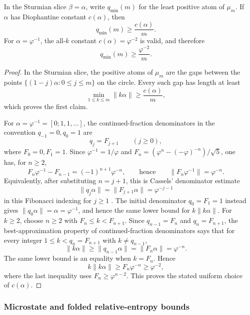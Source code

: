 \begin{proposition}\label{prop:qmin-lowerbound-markov}
In the Sturmian slice \(\beta=\alpha\), write \(q_{\min}(m)\) for the least
positive atom of \(\mu_m\). If \(\alpha\) has Diophantine constant
\(c(\alpha)\), then
\[
q_{\min}(m)\ge \frac{c(\alpha)}{m}.
\]
For \(\alpha=\varphi^{-1}\), the all-\(k\) constant \(c(\alpha)=\varphi^{-2}\)
is valid, and therefore
\[
q_{\min}(m)\ge \frac{\varphi^{-2}}{m}.
\]
\end{proposition}

\begin{proof}
In the Sturmian slice, the positive atoms of \(\mu_m\) are the gaps between the
points \(\{(1-j)\alpha:0\le j\le m\}\) on the circle. Every such gap has length
at least
\[
\min_{1\le k\le m}\|k\alpha\|
\ge \frac{c(\alpha)}{m},
\]
which proves the first claim.

For \(\alpha=\varphi^{-1}=[0;1,1,\ldots]\), the continued-fraction
denominators in the convention \(q_{-1}=0,q_0=1\) are
\[
q_j=F_{j+1}\qquad(j\ge0),
\]
where \(F_0=0,F_1=1\).  Since
\(\varphi^{-1}=1/\varphi\) and \(F_n=(\varphi^n-(-\varphi)^{-n})/\sqrt5\),
one has, for \(n\ge2\),
\[
F_n\varphi^{-1}-F_{n-1}=(-1)^{n+1}\varphi^{-n},
\qquad\text{hence}\qquad
\|F_n\varphi^{-1}\|=\varphi^{-n}.
\]
Equivalently, after substituting \(n=j+1\), this is Cassels' denominator
estimate
\[
\|q_j\alpha\|=\|F_{j+1}\alpha\|=\varphi^{-j-1}
\]
in this Fibonacci indexing for \(j\ge1\) \cite[Ch.~I]{Cassels1957}.  The
initial denominator \(q_0=F_1=1\) instead gives
\(\|q_0\alpha\|=\alpha=\varphi^{-1}\), and hence the same lower bound for
\(k\|k\alpha\|\).  For \(k\ge2\), choose \(n\ge2\) with
\(F_n\le k<F_{n+1}\).  Since \(q_{n-1}=F_n\) and \(q_n=F_{n+1}\), the
best-approximation property of continued-fraction denominators says that for
every integer \(1\le k<q_n=F_{n+1}\) with \(k\ne q_{n-1}\),
\[
\|k\alpha\|\ge \|q_{n-1}\alpha\|=\|F_n\alpha\|=\varphi^{-n}.
\]
The same lower bound is an equality when \(k=F_n\). Hence
\[
k\|k\alpha\|\ge F_n\varphi^{-n}\ge \varphi^{-2},
\]
where the last inequality uses \(F_n\ge\varphi^{n-2}\). This proves the stated
uniform choice of \(c(\alpha)\).
\end{proof}

\subsubsection{Microstate and folded relative-entropy bounds}

